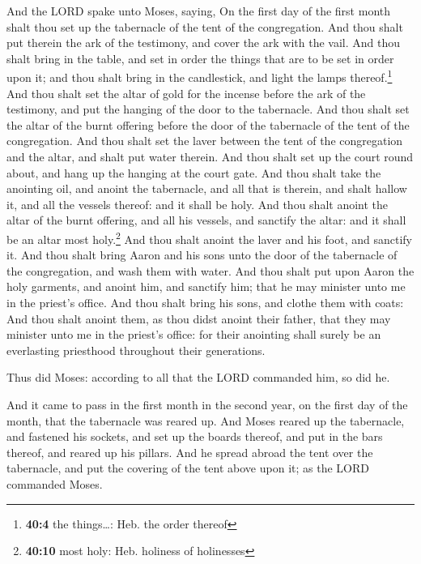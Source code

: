  And the LORD spake unto Moses, saying,  On
the first day of the first month shalt thou set up the tabernacle of the
tent of the congregation.  And thou shalt put therein the
ark of the testimony, and cover the ark with the vail. 
And thou shalt bring in the table, and set in order the things that are
to be set in order upon it; and thou shalt bring in the candlestick, and
light the lamps thereof.\footnote{\textbf{40:4} the things\ldots: Heb.
  the order thereof}  And thou shalt set the altar of gold
for the incense before the ark of the testimony, and put the hanging of
the door to the tabernacle.  And thou shalt set the altar
of the burnt offering before the door of the tabernacle of the tent of
the congregation.  And thou shalt set the laver between
the tent of the congregation and the altar, and shalt put water therein.
 And thou shalt set up the court round about, and hang up
the hanging at the court gate.  And thou shalt take the
anointing oil, and anoint the tabernacle, and all that is therein, and
shalt hallow it, and all the vessels thereof: and it shall be holy.
 And thou shalt anoint the altar of the burnt offering,
and all his vessels, and sanctify the altar: and it shall be an altar
most holy.\footnote{\textbf{40:10} most holy: Heb. holiness of
  holinesses}  And thou shalt anoint the laver and his
foot, and sanctify it.  And thou shalt bring Aaron and
his sons unto the door of the tabernacle of the congregation, and wash
them with water.  And thou shalt put upon Aaron the holy
garments, and anoint him, and sanctify him; that he may minister unto me
in the priest's office.  And thou shalt bring his sons,
and clothe them with coats:  And thou shalt anoint them,
as thou didst anoint their father, that they may minister unto me in the
priest's office: for their anointing shall surely be an everlasting
priesthood throughout their generations.

 Thus did Moses: according to all that the LORD commanded
him, so did he.

 And it came to pass in the first month in the second
year, on the first day of the month, that the tabernacle was reared up.
 And Moses reared up the tabernacle, and fastened his
sockets, and set up the boards thereof, and put in the bars thereof, and
reared up his pillars.  And he spread abroad the tent
over the tabernacle, and put the covering of the tent above upon it; as
the LORD commanded Moses.

